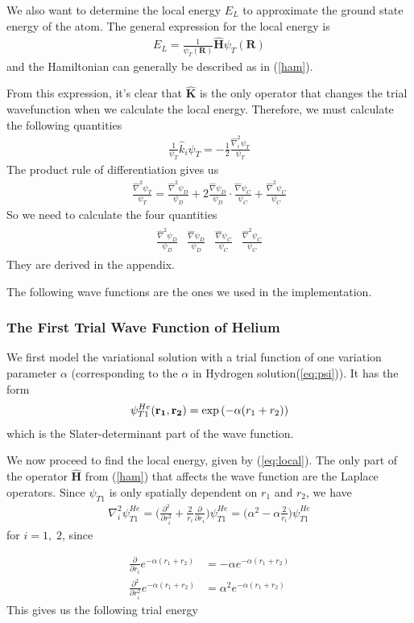 \documentclass[twocolumns, a4paper,11pt,fleqn]{extarticle}
\newcommand{\eq}[1]{{\small\begin{align*}#1\end{align*}}}
\newcommand{\mat}[1]{\begin{matrix}#1\end{matrix}}
\renewcommand\vec[1]{\boldsymbol{\mathbf{#1}}}
\newcommand{\OP}[1]{\mathbf{\widehat{#1}}}
\newcommand{\op}[1]{\hat{#1}}
\begin{document}
We also want to determine the local energy $E_L$ to approximate
the ground state energy of the atom.
The general expression for the local energy is
\eq{
  E_L = \frac{1}{\psi_T (\vec R)}\OP H \psi_T (\vec R) 
}
and the Hamiltonian can generally be described as in (\ref{ham}).

From this expression, it's clear that $\OP K$ is the only operator that changes the
trial wavefunction when we calculate the local energy. Therefore, we must calculate the
following quantities
\eq{
  \frac{1}{\psi_T}\op k_i \psi_T = -\frac{1}{2}\frac{\op\nabla_i^2 \psi_T}{\psi_T}
}
The product rule of differentiation gives us
\eq{
  \frac{\op\nabla^2 \psi_T}{\psi_T} = 
  \frac{\op\nabla^2 \psi_D}{\psi_D}
    +2 \frac{\op\nabla \psi_D}{\psi_D}\cdot\frac{\op\nabla \psi_C}{\psi_C}
    +\frac{\op\nabla^2 \psi_C}{\psi_C}
}
So we need to calculate the four quantities
\eq{\mat{
  \frac{\op\nabla^2 \psi_D}{\psi_D}&
    \frac{\op\nabla \psi_D}{\psi_D}&
    \frac{\op\nabla \psi_C}{\psi_C}&
    \frac{\op\nabla^2 \psi_C}{\psi_C}
}}
They are derived in the appendix.

The following wave functions are the ones we used in the implementation.

\subsubsection{The First Trial Wave Function of Helium}
We first model the variational solution with a trial function of one
variation parameter $\alpha$ 
(corresponding to the $\alpha$ in Hydrogen solution(\ref{eq:psi})).
It has the form
\eq{
\psi_{T1}^{He}({\bf r_1},{\bf r_2}) = 
   \exp{\left(-\alpha(r_1+r_2)\right)}
}
which is the Slater-determinant part of the wave function.

We now proceed to find the local energy, given by (\ref{eq:local}).
The only part of the operator $\OP H$ from (\ref{ham}) that affects the wave function
are the Laplace operators.
Since $\psi_{T1}$ is only spatially dependent on $r_1$ and $r_2$, we have
\eq{
  \nabla_i^2 \psi_{T1}^{He} = \bigg( \frac{\partial^2}{\partial r_i^2} 
    + \frac{2}{r_i} \frac{\partial}{\partial r_i} \bigg) \psi_{T1}^{He}
    = \bigg( \alpha^2 -\alpha\frac{2}{r_i}  \bigg)\psi_{T1}^{He}
}
for $i = 1,\;2$, since

\eq{
  \frac{\partial}{\partial r_i} e^{-\alpha (r_1+r_2)}
    &= -\alpha e^{-\alpha (r_1+r_2)}\\
\frac{\partial^2}{\partial r_i^2} e^{-\alpha (r_1+r_2)}
    &= \alpha^2 e^{-\alpha (r_1+r_2)}
}
This gives us the following trial energy
\end{document}
